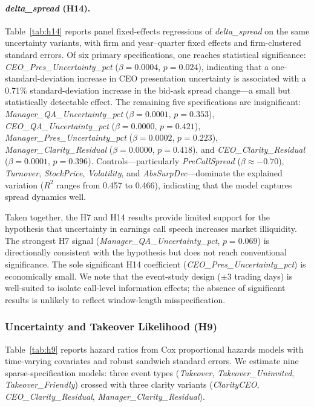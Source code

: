 \documentclass[12pt,a4paper]{article}
\begin{document}
\paragraph{\textit{delta\_spread} (H14).}
Table~\ref{tab:h14} reports panel fixed-effects regressions of \textit{delta\_spread} on the same uncertainty variants, with firm and year--quarter fixed effects and firm-clustered standard errors. Of six primary specifications, one reaches statistical significance: \textit{CEO\_Pres\_Uncertainty\_pct} ($\beta = 0.0004$, $p = 0.024$), indicating that a one-standard-deviation increase in CEO presentation uncertainty is associated with a 0.71\% standard-deviation increase in the bid-ask spread change---a small but statistically detectable effect. The remaining five specifications are insignificant: \textit{Manager\_QA\_Uncertainty\_pct} ($\beta = 0.0001$, $p = 0.353$), \textit{CEO\_QA\_Uncertainty\_pct} ($\beta = 0.0000$, $p = 0.421$), \textit{Manager\_Pres\_Uncertainty\_pct} ($\beta = 0.0002$, $p = 0.223$), \textit{Manager\_Clarity\_Residual} ($\beta = 0.0000$, $p = 0.418$), and \textit{CEO\_Clarity\_Residual} ($\beta = 0.0001$, $p = 0.396$). Controls---particularly \textit{PreCallSpread} ($\beta \approx -0.70$), \textit{Turnover}, \textit{StockPrice}, \textit{Volatility}, and \textit{AbsSurpDec}---dominate the explained variation ($R^2$ ranges from 0.457 to 0.466), indicating that the model captures spread dynamics well.

Taken together, the H7 and H14 results provide limited support for the hypothesis that uncertainty in earnings call speech increases market illiquidity. The strongest H7 signal (\textit{Manager\_QA\_Uncertainty\_pct}, $p = 0.069$) is directionally consistent with the hypothesis but does not reach conventional significance. The sole significant H14 coefficient (\textit{CEO\_Pres\_Uncertainty\_pct}) is economically small. We note that the event-study design ($\pm$3 trading days) is well-suited to isolate call-level information effects; the absence of significant results is unlikely to reflect window-length misspecification.

\subsubsection{Uncertainty and Takeover Likelihood (H9)}
\label{sec:h9}

Table~\ref{tab:h9} reports hazard ratios from Cox proportional hazards models with time-varying covariates and robust sandwich standard errors. We estimate nine sparse-specification models: three event types (\textit{Takeover}, \textit{Takeover\_Uninvited}, \textit{Takeover\_Friendly}) crossed with three clarity variants (\textit{ClarityCEO}, \textit{CEO\_Clarity\_Residual}, \textit{Manager\_Clarity\_Residual}).
\end{document}
